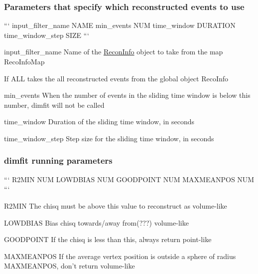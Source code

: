 \subsubsection*{Parameters that specify which reconstructed events to use}

``` input\-\_\-filter\-\_\-name N\-A\-M\-E min\-\_\-events N\-U\-M time\-\_\-window D\-U\-R\-A\-T\-I\-O\-N time\-\_\-window\-\_\-step S\-I\-Z\-E ```


\begin{DoxyItemize}
\item {\ttfamily input\-\_\-filter\-\_\-name} Name of the {\ttfamily \hyperlink{classReconInfo}{Recon\-Info}} object to take from the map {\ttfamily Reco\-Info\-Map}
\begin{DoxyItemize}
\item If A\-L\-L takes the all reconstructed events from the global object {\ttfamily Reco\-Info}
\end{DoxyItemize}
\item {\ttfamily min\-\_\-events} When the number of events in the sliding time window is below this number, dimfit will not be called
\item {\ttfamily time\-\_\-window} Duration of the sliding time window, in seconds
\item {\ttfamily time\-\_\-window\-\_\-step} Step size for the sliding time window, in seconds
\end{DoxyItemize}

\subsubsection*{dimfit running parameters}

``` R2\-M\-I\-N N\-U\-M L\-O\-W\-D\-B\-I\-A\-S N\-U\-M G\-O\-O\-D\-P\-O\-I\-N\-T N\-U\-M M\-A\-X\-M\-E\-A\-N\-P\-O\-S N\-U\-M ```


\begin{DoxyItemize}
\item {\ttfamily R2\-M\-I\-N} The chisq must be above this value to reconstruct as volume-\/like
\item {\ttfamily L\-O\-W\-D\-B\-I\-A\-S} Bias chisq towards/away from(???) volume-\/like
\item {\ttfamily G\-O\-O\-D\-P\-O\-I\-N\-T} If the chisq is less than this, always return point-\/like
\item {\ttfamily M\-A\-X\-M\-E\-A\-N\-P\-O\-S} If the average vertex position is outside a sphere of radius {\ttfamily M\-A\-X\-M\-E\-A\-N\-P\-O\-S}, don't return volume-\/like
\end{DoxyItemize}

